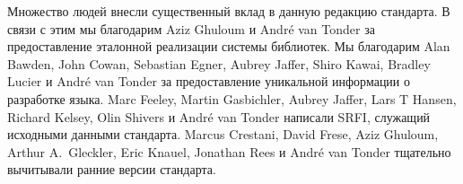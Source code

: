 Множество людей внесли существенный вклад в данную редакцию стандарта. В связи с этим мы
благодарим Aziz Ghuloum и Andr\'e van Tonder за предоставление эталонной реализации системы
библиотек. Мы благодарим Alan Bawden, John Cowan, Sebastian Egner, Aubrey Jaffer, Shiro Kawai,
Bradley Lucier и Andr\'e van Tonder за предоставление уникальной информации о разработке языка.
Marc Feeley, Martin Gasbichler, Aubrey Jaffer, Lars T Hansen, Richard Kelsey, Olin Shivers и
Andr\'e van Tonder написали SRFI, служащий исходными данными стандарта. Marcus
Crestani, David Frese, Aziz Ghuloum, Arthur A.\ Gleckler, Eric Knauel, Jonathan Rees и Andr\'e
van Tonder тщательно вычитывали ранние версии стандарта.\vspace{4mm}

